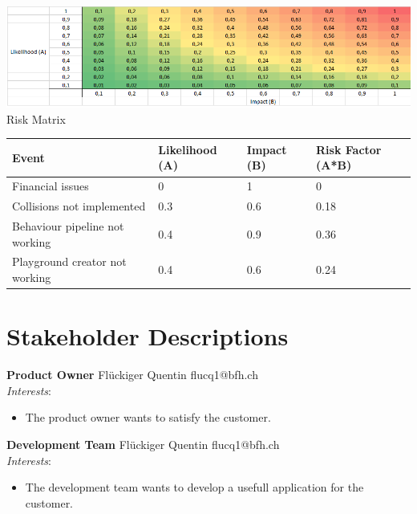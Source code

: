 \documentclass{scrbook}
\begin{document}
\begin{center}
  \includegraphics[width=\textwidth]{./risk-matrix}\\
  Risk Matrix
\end{center}

\begin{tabular}{p{2cm} p{2cm} p{2cm} p{2cm}}
  Event & Likelihood (A) & Impact (B) & Risk Factor (A*B) \\ \hline
  Financial issues & 0 & 1 & 0 \\
  Collisions not implemented & 0.3 & 0.6 & 0.18 \\
  Behaviour pipeline not working & 0.4 & 0.9 & 0.36 \\
  Playground creator not working & 0.4 & 0.6 & 0.24 \\
\end{tabular}

\section{Stakeholder Descriptions}
\textbf{Product Owner}
Flückiger Quentin flucq1@bfh.ch \\
\textit{Interests}:
\begin{itemize}
  \item The product owner wants to satisfy the customer.
\end{itemize}


\textbf{Development Team}
Flückiger Quentin flucq1@bfh.ch \\
\textit{Interests}:
\begin{itemize}
  \item The development team wants to develop a usefull application for the customer.
\end{itemize}
\end{document}

